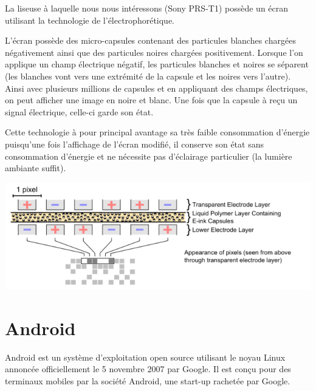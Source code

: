 La liseuse à laquelle nous nous intéressons (Sony PRS-T1) possède un écran utilisant la technologie de l'électrophorétique.

L'écran possède des micro-capsules contenant des particules blanches chargées négativement ainsi que des particules noires chargées positivement. Lorsque l'on applique un champ électrique négatif, les particules blanches et noires se séparent (les blanches vont vers une extrémité de la capsule et les noires vers l'autre). Ainsi avec plusieurs millions de capsules et en appliquant des champs électriques, on peut afficher une image en noire et blanc. Une fois que la capsule à reçu un signal électrique, celle-ci garde son état.

Cette technologie à pour principal avantage sa très faible consommation d'énergie puisqu'une fois l'affichage de l'écran modifié, il conserve son état sans consommation d'énergie et ne nécessite pas d'éclairage particulier (la lumière ambiante suffit).

\begin{center}
	\includegraphics{Electrophoretic.png}
\end{center}


\section{Android}
Android est un système d'exploitation open source utilisant le noyau Linux annoncée officiellement le 5 novembre 2007 par Google. Il est conçu pour des terminaux mobiles par la société Android, une start-up rachetée par Google.

